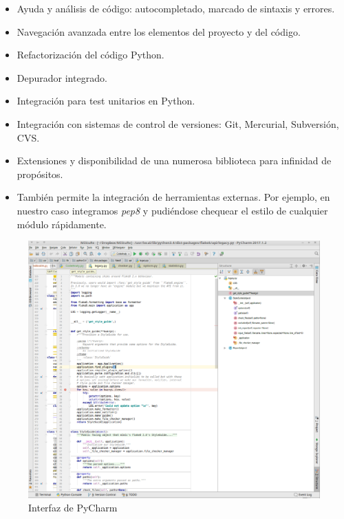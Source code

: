 \begin{itemize}
\item Ayuda y análisis de código: autocompletado, marcado de sintaxis y errores.

\item Navegación avanzada entre los elementos del proyecto y del código.

\item Refactorización del código Python.

\item Depurador integrado.

\item Integración para test unitarios en Python.

\item Integración con sistemas de control de versiones: Git, Mercurial, Subversión, CVS.

\item Extensiones y disponibilidad de una numerosa biblioteca para infinidad de propósitos.

\item También permite la integración de herramientas externas. Por ejemplo, en nuestro caso integramos \textit{pep8} y pudiéndose chequear el estilo de cualquier módulo rápidamente.
\end{itemize}


\begin{figure}[H]
   \centering
   \includegraphics[width=16cm]{img/pycharm}
   \caption{Interfaz de PyCharm }
   \label{figura:pycharm}
\end{figure}



